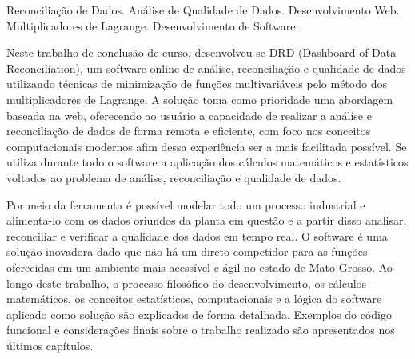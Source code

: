 \documentclass[tcc/eca]{faeng}
\begin{document}
\begin{resumo}{Reconciliação de Dados. Análise de Qualidade de Dados. Desenvolvimento Web. Multiplicadores de Lagrange. Desenvolvimento de Software.}

Neste trabalho de conclusão de curso, desenvolveu-se DRD (Dashboard of Data Reconciliation), um software online de análise, reconciliação e qualidade de dados utilizando técnicas de minimização de funções multivariáveis pelo método dos multiplicadores de Lagrange. A solução toma como prioridade uma abordagem baseada na web, oferecendo ao usuário a capacidade de realizar a análise e reconciliação de dados de forma remota e eficiente, com foco nos conceitos computacionais modernos afim dessa experiência ser a mais facilitada possível. Se utiliza durante todo o software a aplicação dos cálculos matemáticos e estatísticos voltados ao problema de análise, reconciliação e qualidade de dados. 

Por meio da ferramenta é possível modelar todo um processo industrial e alimenta-lo com os dados oriundos da planta em questão e a partir disso analisar, reconciliar e verificar a qualidade dos dados em tempo real. O software é uma solução inovadora dado que não há um direto competidor para as funções oferecidas em um ambiente mais acessível e ágil no estado de Mato Grosso. Ao longo deste trabalho, o processo filosófico do desenvolvimento, os cálculos matemáticos, os conceitos estatísticos, computacionais e a lógica do software aplicado como solução são explicados de forma detalhada. Exemplos do código funcional e considerações finais sobre o trabalho realizado são apresentados nos últimos capítulos.

\end{resumo}
\end{document}
